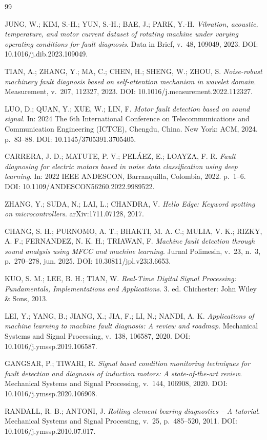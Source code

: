 \documentclass[12pt,a4paper]{article}
\begin{document}
\begin{thebibliography}{99}

 JUNG, W.; KIM, S.-H.; YUN, S.-H.; BAE, J.; PARK, Y.-H. \emph{Vibration, acoustic, temperature, and motor current dataset of rotating machine under varying operating conditions for fault diagnosis}. Data in Brief, v.~48, 109049, 2023. DOI: 10.1016/j.dib.2023.109049.

 TIAN, A.; ZHANG, Y.; MA, C.; CHEN, H.; SHENG, W.; ZHOU, S. \emph{Noise-robust machinery fault diagnosis based on self-attention mechanism in wavelet domain}. Measurement, v.~207, 112327, 2023. DOI: 10.1016/j.measurement.2022.112327.

 LUO, D.; QUAN, Y.; XUE, W.; LIN, F. \emph{Motor fault detection based on sound signal}. In: 2024 The 6th International Conference on Telecommunications and Communication Engineering (ICTCE), Chengdu, China. New York: ACM, 2024. p.~83--88. DOI: 10.1145/3705391.3705405.

 CARRERA, J. D.; MATUTE, P. V.; PELÁEZ, E.; LOAYZA, F. R. \emph{Fault diagnosing for electric motors based in noise data classification using deep learning}. In: 2022 IEEE ANDESCON, Barranquilla, Colombia, 2022. p.~1--6. DOI: 10.1109/ANDESCON56260.2022.9989522.

 ZHANG, Y.; SUDA, N.; LAI, L.; CHANDRA, V. \emph{Hello Edge: Keyword spotting on microcontrollers}. arXiv:1711.07128, 2017.

 CHANG, S. H.; PURNOMO, A. T.; BHAKTI, M. A. C.; MULIA, V. K.; RIZKY, A. F.; FERNANDEZ, N. K. H.; TRIAWAN, F. \emph{Machine fault detection through sound analysis using MFCC and machine learning}. Jurnal Polimesin, v.~23, n.~3, p.~270--278, jun. 2025. DOI: 10.30811/jpl.v23i3.6653.

 KUO, S. M.; LEE, B. H.; TIAN, W. \emph{Real-Time Digital Signal Processing: Fundamentals, Implementations and Applications}. 3. ed. Chichester: John Wiley \& Sons, 2013.

 LEI, Y.; YANG, B.; JIANG, X.; JIA, F.; LI, N.; NANDI, A. K. \emph{Applications of machine learning to machine fault diagnosis: A review and roadmap}. Mechanical Systems and Signal Processing, v.~138, 106587, 2020. DOI: 10.1016/j.ymssp.2019.106587.

 GANGSAR, P.; TIWARI, R. \emph{Signal based condition monitoring techniques for fault detection and diagnosis of induction motors: A state-of-the-art review}. Mechanical Systems and Signal Processing, v.~144, 106908, 2020. DOI: 10.1016/j.ymssp.2020.106908.

 RANDALL, R. B.; ANTONI, J. \emph{Rolling element bearing diagnostics -- A tutorial}. Mechanical Systems and Signal Processing, v.~25, p.~485--520, 2011. DOI: 10.1016/j.ymssp.2010.07.017.

\end{thebibliography}
\end{document}
